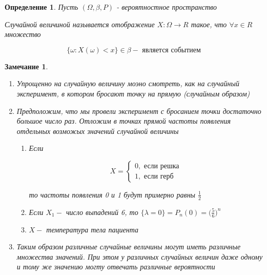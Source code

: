 \documentclass[a4paper, 14pt]{report}
\newtheorem{defenition}{Определение}[chapter]
\newtheorem{note}{Замечание}[chapter]
\begin{document}
\begin{defenition}
    Пусть $(\Omega, \beta, P)$ - вероятностное пространство

    Случайной величиной называется отображение $X: \Omega \to R$ такое, что $\forall x \in R$ множество

    $$
    \{ \omega : X(\omega) < x \} \in \beta - \text{ является событием}
    $$
\end{defenition}

\begin{note}
    \hfill

    \begin{enumerate}
        \item Упрощенно на случайную величину моэно смотреть, как на случайный эксперимент, в котором бросают точку на прямую (случайным образом)
        \item Предположим, что мы провели эксперимент с бросанием точки достаточно большое число раз. Отложим в точках прямой частоты появления отдельных возможых значений случайной величины

            \begin{enumerate}
                \item Если

                    $$
                    X =
                    \begin{cases}
                        0, \text{ если решка} \\
                        1, \text{ если герб}
                    \end{cases}
                    $$

                    то частоты появления 0 и 1 будут примерно равны $\frac{1}{2}$

                \item Если $X_1 -$ число выпадений 6, то $\{ \lambda = 0\} = P_n(0) = \big( \frac{5}{6} \big)^n$

                \item $X - $ температура тела пациента
            \end{enumerate}

        \item Таким образом различные случайные величины могут иметь различные множества значений. При этом у различных случайных величин даже одному и тому же значению могту отвечать различные вероятности
    \end{enumerate}
\end{note}
\end{document}
